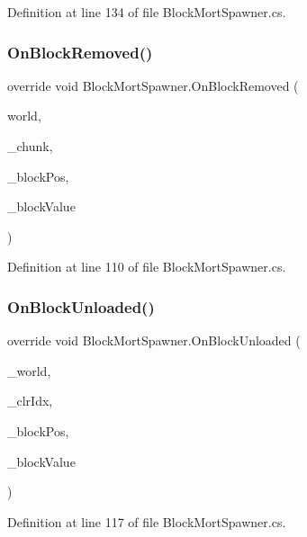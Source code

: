 Definition at line 134 of file Block\+Mort\+Spawner.\+cs.

\mbox{\label{class_block_mort_spawner_a1b17de2a785ae5c703531bf9caf6fa9d}} 
\subsubsection{\texorpdfstring{OnBlockRemoved()}{OnBlockRemoved()}}
{\footnotesize\ttfamily override void Block\+Mort\+Spawner.\+On\+Block\+Removed (\begin{DoxyParamCaption}\item[{World\+Base}]{world,  }\item[{Chunk}]{\+\_\+chunk,  }\item[{Vector3i}]{\+\_\+block\+Pos,  }\item[{Block\+Value}]{\+\_\+block\+Value }\end{DoxyParamCaption})}



Definition at line 110 of file Block\+Mort\+Spawner.\+cs.

\mbox{\label{class_block_mort_spawner_a13cedf92b3ecbcf25db06376c55ee47c}} 
\subsubsection{\texorpdfstring{OnBlockUnloaded()}{OnBlockUnloaded()}}
{\footnotesize\ttfamily override void Block\+Mort\+Spawner.\+On\+Block\+Unloaded (\begin{DoxyParamCaption}\item[{World\+Base}]{\+\_\+world,  }\item[{int}]{\+\_\+clr\+Idx,  }\item[{Vector3i}]{\+\_\+block\+Pos,  }\item[{Block\+Value}]{\+\_\+block\+Value }\end{DoxyParamCaption})}



Definition at line 117 of file Block\+Mort\+Spawner.\+cs.

\mbox{\label{class_block_mort_spawner_a9c5df57f2bd03b35d708e4cf12d1423f}} 
